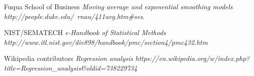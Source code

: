 \documentclass[conference,onecolumn]{IEEEtran}
\begin{document}
\ifCLASSOPTIONcaptionsoff
  \newpage
\fi



\begin{thebibliography}{1}
 Fuqua School of Business {\em Moving average and exponential smoothing models} {\em http://people.duke.edu/~rnau/411avg.htm\#ses}.

 NIST/SEMATECH {\em e-Handbook of Statistical Methods} {\em http://www.itl.nist.gov/div898/handbook/pmc/section4/pmc432.htm}

 Wikipedia contributors {\em Regression analysis} {\em https://en.wikipedia.org/w/index.php?title=Regression\_analysis\&oldid=738229734}
\end{thebibliography}
\end{document}
